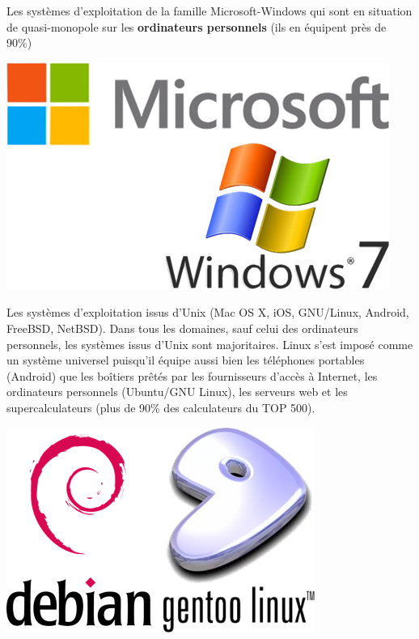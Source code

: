\documentclass[11pt,oneside]{article}
\begin{document}
\begin{minipage}[c]{.7\linewidth}
Les systèmes d’exploitation de la famille Microsoft-Windows qui sont en situation de quasi-monopole sur les \textbf{ordinateurs personnels} (ils en équipent près de 90\%)

\end{minipage} \hfill
\begin{minipage}[c]{.25\linewidth}
\begin{center}
\includegraphics[width=.9\textwidth]{png/ms}
\end{center}
\end{minipage} 

\begin{minipage}[c]{.7\linewidth}
Les systèmes d’exploitation issus d’Unix (Mac OS X, iOS, GNU/Linux, Android, FreeBSD, NetBSD). Dans tous les domaines, sauf celui des ordinateurs personnels, les systèmes issus d’Unix sont majoritaires.  Linux s’est imposé comme un système universel puisqu’il équipe aussi bien les téléphones portables (Android) que les boîtiers prêtés par les fournisseurs d’accès à Internet, les ordinateurs personnels (Ubuntu/GNU Linux), les serveurs web et les supercalculateurs (plus de 90\% des calculateurs du TOP 500).

\end{minipage} \hfill
\begin{minipage}[c]{.25\linewidth}
\begin{center}
\includegraphics[width=.9\textwidth]{png/genlin}
\end{center}
\end{minipage} 
\end{document}
